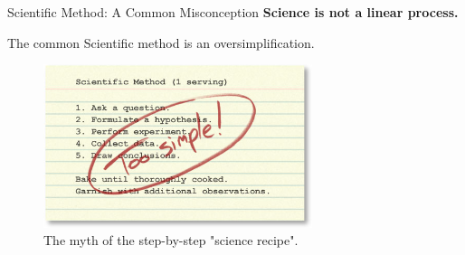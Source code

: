 \begin{frame}{Scientific Method: A Common Misconception}
	\textbf{Science is not a linear process.}

	The common Scientific method is an
	oversimplification.

	\begin{figure}
		\centering
		\includegraphics[width=0.7\textwidth]{Figures/sciencerecipe.jpg}
		\caption{The myth of the step-by-step "science recipe". \cite{Science}}
	\end{figure}

\end{frame}

